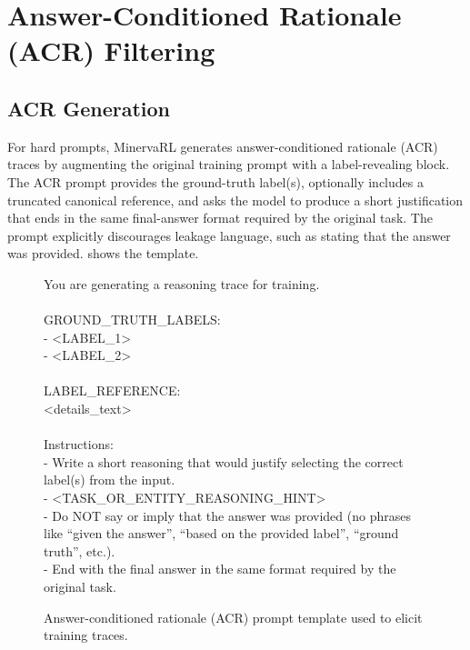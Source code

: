 \section{Answer-Conditioned Rationale (ACR) Filtering}
\label{app:filtering}

\subsection{ACR Generation}
\label{subsec:acr-generation}

For hard prompts, MinervaRL generates answer-conditioned rationale (ACR) traces by augmenting the original training prompt with a label-revealing block. The ACR prompt provides the ground-truth label(s), optionally includes a truncated canonical reference, and asks the model to produce a short justification that ends in the same final-answer format required by the original task. The prompt explicitly discourages leakage language, such as stating that the answer was provided.  shows the template.

\begin{figure}[t]
\centering
\begin{tcolorbox}[title=ACR Generation Prompt]
You are generating a reasoning trace for training.\\
\\
GROUND\_TRUTH\_LABELS:\\
- \textless LABEL\_1\textgreater\\
- \textless LABEL\_2\textgreater\\
\\
LABEL\_REFERENCE:\\
\textless details\_text\textgreater\\
\\
Instructions:\\
- Write a short reasoning that would justify selecting the correct label(s) from the input.\\
- \textless TASK\_OR\_ENTITY\_REASONING\_HINT\textgreater\\
- Do NOT say or imply that the answer was provided (no phrases like ``given the answer'', ``based on the provided label'', ``ground truth'', etc.).\\
- End with the final answer in the same format required by the original task.
\end{tcolorbox}
\caption{Answer-conditioned rationale (ACR) prompt template used to elicit training traces.}
\label{fig:acr-template}
\end{figure}


